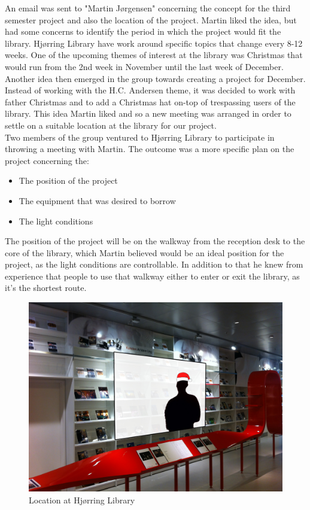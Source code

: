 An email was sent to "Martin Jørgensen" concerning the concept for the third semester project and also the location of the project. Martin liked the idea, but had some concerns to identify the period in which the project would fit the library. Hjørring Library have work around specific topics that change every 8-12 weeks. One of the upcoming themes of interest at the library was Christmas that would run from the 2nd week in November until the last week of December. Another idea then emerged in the group towards creating a project for December. Instead of working with the H.C. Andersen theme, it was decided to work with father Christmas and to add a Christmas hat on-top of trespassing users of the library. This idea Martin liked and so a new meeting was arranged in order to settle on a suitable location at the library for our project.\\
Two members of the group ventured to Hjørring Library to participate in throwing a meeting with Martin. The outcome was a more specific plan on the project concerning the:
\begin{itemize}
\item The position of the project
\item The equipment that was desired to borrow
\item The light conditions
\end{itemize}
The position of the project will be on the walkway from the reception desk to the core of the library, which Martin believed would be an ideal position for the project, as the light conditions are controllable. In addition to that he knew from experience that people to use that walkway either to enter or exit the library, as it's the shortest route.
\begin{figure}[htbp]
\centering
\includegraphics[width=1.00\textwidth]{Pictures/HjoerringLibrary/LocationJohannesHat.jpg}
\caption{Location at Hjørring Library}
\label{fig:Location at Hjørring Library}
\end{figure}



